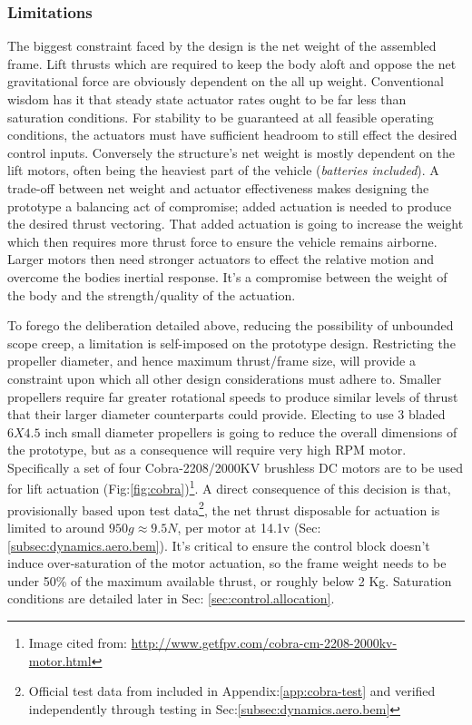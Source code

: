 \subsubsection{Limitations}
\label{subsubsec:intro.foreword.limits}
The biggest constraint faced by the design is the net weight of the assembled frame. Lift thrusts which are required to keep the body aloft and oppose the net gravitational force are obviously dependent on the all up weight. Conventional wisdom has it that steady state actuator rates ought to be far less than saturation conditions. For stability to be guaranteed at all feasible operating conditions, the actuators must have sufficient headroom to still effect the desired control inputs. Conversely the structure's net weight is mostly dependent on the lift motors, often being the heaviest part of the vehicle (\emph{batteries included}). A trade-off between net weight and actuator effectiveness makes designing the prototype a balancing act of compromise; added actuation is needed to produce the desired thrust vectoring. That added actuation is going to increase the weight which then requires more thrust force to ensure the vehicle remains airborne. Larger motors then need stronger actuators to effect the relative motion and overcome the bodies inertial response. It's a compromise between the weight of the body and the strength/quality of the actuation.
\par
To forego the deliberation detailed above, reducing the possibility of unbounded scope creep, a limitation is self-imposed on the prototype design. Restricting the propeller diameter, and hence maximum thrust/frame size, will provide a constraint upon which all other design considerations must adhere to. Smaller propellers require far greater rotational speeds to produce similar levels of thrust that their larger diameter counterparts could provide. Electing to use 3 bladed $6X4.5$ inch small diameter propellers is going to reduce the overall dimensions of the prototype, but as a consequence will require very high RPM motor. Specifically a set of four Cobra-2208/2000KV\cite{cobramotor} brushless DC motors are to be used for lift actuation (Fig:\ref{fig:cobra})\footnote{Image cited from: \url{http://www.getfpv.com/cobra-cm-2208-2000kv-motor.html}}. A direct consequence of this decision is that, provisionally based upon test data\footnote{Official test data from\cite{cobramotor} included in Appendix:\ref{app:cobra-test} and verified independently through testing in Sec:\ref{subsec:dynamics.aero.bem}}, the net thrust disposable for actuation is limited to around $950g\approx 9.5 N$, per motor at 14.1v (Sec:\ref{subsec:dynamics.aero.bem}). It's critical to ensure the control block doesn't induce over-saturation of the motor actuation, so the frame weight needs to be under 50\% of the maximum available thrust, or roughly below 2 Kg. Saturation conditions are detailed later in Sec: \ref{sec:control.allocation}.
